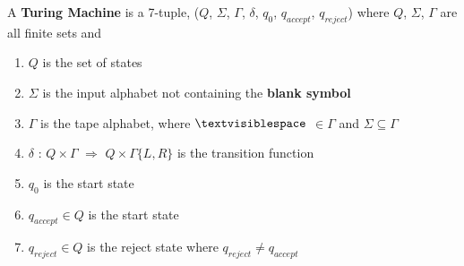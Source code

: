 \documentclass{article}
\begin{document}
A \textbf{Turing Machine} is a 7-tuple, ($Q$, $\Sigma$, $\Gamma$, $\delta$, $q_0$, $q_{accept}$, $q_{reject}$) where $Q$, $\Sigma$, $\Gamma$ are all finite sets and

\begin{enumerate}
    \item $Q$ is the set of states
    \item $\Sigma$ is the input alphabet not containing the \textbf{blank symbol} \textvisiblespace
    \item $\Gamma$ is the tape alphabet, where $\textvisiblespace$ $\in \Gamma$ and $\Sigma \subseteq \Gamma$
    \item $\delta$ : $Q \times \Gamma $ $\Longrightarrow$ $Q \times \Gamma \{L,R\}$ is the transition function
    \item $q_0$ is the start state
    \item $q_{accept} \in Q$ is the start state
    \item $q_{reject} \in Q$ is the reject state where $q_{reject} \neq q_{accept}$
    
\end{enumerate}
\end{document}
